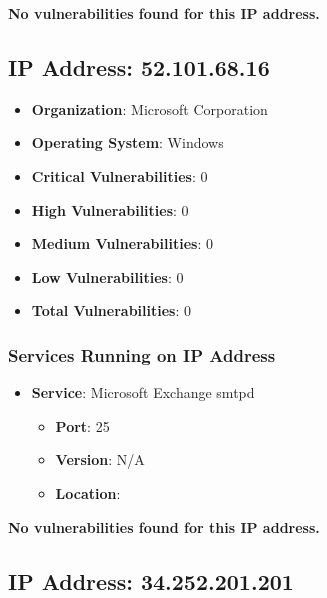 \documentclass{article}
\begin{document}
\textbf{No vulnerabilities found for this IP address.}




\clearpage



\subsection*{IP Address: 52.101.68.16}

\begin{itemize}
    \item \textbf{Organization}: Microsoft Corporation
    \item \textbf{Operating System}:  Windows 
    \item \textbf{Critical Vulnerabilities}: 0
    \item \textbf{High Vulnerabilities}: 0
    \item \textbf{Medium Vulnerabilities}: 0
    \item \textbf{Low Vulnerabilities}: 0
    \item \textbf{Total Vulnerabilities}: 0
\end{itemize}

\subsubsection*{Services Running on IP Address}

\begin{itemize}
    
        \item \textbf{Service}: Microsoft Exchange smtpd
        \begin{itemize}
            \item \textbf{Port}: 25
            \item \textbf{Version}:  N/A 
            \item \textbf{Location}: \href{  }{  }
        \end{itemize}
    
\end{itemize}


\textbf{No vulnerabilities found for this IP address.}




\clearpage



\subsection*{IP Address: 34.252.201.201}
\end{document}
